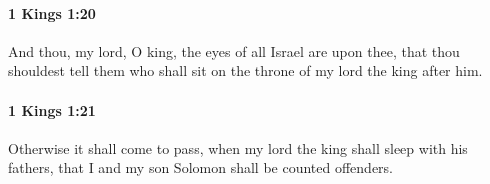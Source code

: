 		\paragraph{1 Kings 1:20} %
			\label{1KINGS-1-20}

			And thou, my lord, O king, the eyes of all Israel are upon thee, that thou shouldest tell them who shall sit on the throne of my lord the king after him.


		\paragraph{1 Kings 1:21} %
			\label{1KINGS-1-21}

			Otherwise it shall come to pass, when my lord the king shall sleep with his fathers, that I and my son Solomon shall be counted offenders.


